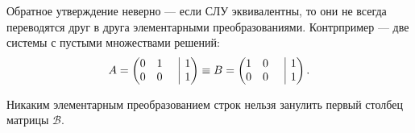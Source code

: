 \begin{orangebox}
    Обратное утверждение неверно --- если СЛУ эквивалентны, то они не всегда переводятся друг в друга элементарными преобразованиями. Контрпример --- две системы с пустыми множествами решений:
    $$
    A = 
    \begin{pmatrix}
        0 & 1 & \bord & 1\\
        0 & 0 & \bord & 1
    \end{pmatrix} \equiv
    B = 
    \begin{pmatrix}
        1 & 0 & \bord & 1\\
        0 & 0 & \bord & 1
    \end{pmatrix}.
    $$

    Никаким элементарным преобразованием строк нельзя занулить первый столбец матрицы $\mathcal{B}$.
\end{orangebox}

